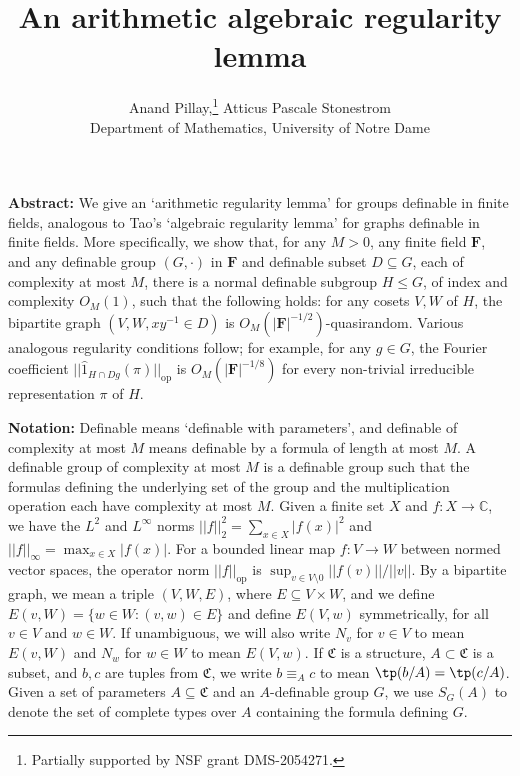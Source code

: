 \documentclass[10pt]{article}
\title{{\Large \textbf{An arithmetic algebraic regularity lemma}}}
\author{Anand Pillay,\footnote[1]{Partially supported by NSF grant DMS-2054271.} Atticus Pascale Stonestrom\\{\small Department of Mathematics, University of Notre Dame}}
\makeatletter
\renewcommand{\maketitle}{\bgroup\setlength{\parindent}{0pt}
\begin{flushleft}
  \textbf{\@title}

  \@author
\end{flushleft}\egroup
} %
\makeatother
\begin{document}
\maketitle

{\small\noindent\textbf{Abstract:} We give an `arithmetic regularity lemma' for groups definable in finite fields, analogous to Tao's `algebraic regularity lemma' for graphs definable in finite fields. More specifically, we show that, for any $M>0$, any finite field $\mathbf{F}$, and any definable group $(G,\cdot)$ in $\mathbf{F}$ and definable subset $D\subseteq G$, each of complexity at most $M$, there is a normal definable subgroup $H\leqslant G$, of index and complexity $O_M(1)$, such that the following holds: for any cosets $V,W$ of $H$, the bipartite graph $(V,W,xy^{-1}\in D)$ is $O_M(|\mathbf{F}|^{-1/2})$-quasirandom. Various analogous regularity conditions follow; for example, for any $g\in G$, the Fourier coefficient $||\widehat{1}_{H\cap Dg}(\pi)||_{\mathrm{op}}$ is $O_M(|\mathbf{F}|^{-1/8})$ for every non-trivial irreducible representation $\pi$ of $H$. \newline 

\noindent\textbf{Notation:} Definable means `definable with parameters', and definable of complexity at most $M$ means definable by a formula of length at most $M$. A definable group of complexity at most $M$ is a definable group such that the formulas defining the underlying set of the group and the multiplication operation each have complexity at most $M$. Given a finite set $X$ and $f:X\to\mathbb{C}$, we have the $L^2$ and $L^\infty$ norms $||f||_2^2=\sum_{x\in X}|f(x)|^2$ and $||f||_\infty=\max_{x\in X}|f(x)|$. For a bounded linear map $f:V\to W$ between normed vector spaces, the operator norm $||f||_{\mathrm{op}}$ is $\sup_{v\in V\setminus 0}||f(v)||/||v||$. By a bipartite graph, we mean a triple $(V,W,E)$, where $E\subseteq V\times W$, and we define $E(v,W)=\{w\in W:(v,w)\in E\}$ and define $E(V,w)$ symmetrically, for all $v\in V$ and $w\in W$. If unambiguous, we will also write $N_v$ for $v\in V$ to mean $E(v,W)$ and $N_w$ for $w\in W$ to mean $E(V,w)$. If $\mathfrak{C}$ is a structure, $A\subset\mathfrak{C}$ is a subset, and $b,c$ are tuples from $\mathfrak{C}$, we write $b\equiv_A c$ to mean $\tp(b/A)=\tp(c/A)$. Given a set of parameters $A\subseteq\mathfrak{C}$ and an $A$-definable group $G$, we use $S_G(A)$ to denote the set of complete types over $A$ containing the formula defining $G$.


}
\end{document}
